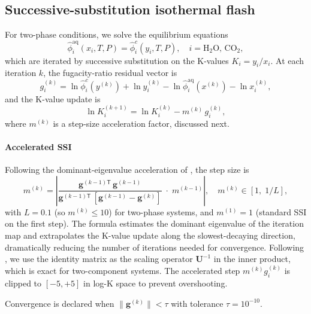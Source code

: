\documentclass[preprint,12pt,authoryear]{elsarticle}
\begin{document}
\subsection{Successive-substitution isothermal flash}
\label{sec:ssi}

For two-phase conditions, we solve the equilibrium equations
\begin{equation}
  \hat{\phi}_i^{\text{aq}}(x_i, T, P) = \hat{\phi}_i^c(y_i, T, P), \quad i = \text{H}_2\text{O},\, \text{CO}_2,
  \label{eq:iso_eq}
\end{equation}
which are iterated by successive substitution on the K-values $K_i = y_i / x_i$.  At each iteration $k$, the fugacity-ratio residual vector is
\begin{equation}
  g_i^{(k)} = \ln\hat{\phi}_i^c(y^{(k)}) + \ln y_i^{(k)}
             - \ln\hat{\phi}_i^{\text{aq}}(x^{(k)}) - \ln x_i^{(k)},
  \label{eq:lng}
\end{equation}
and the K-value update is
\begin{equation}
  \ln K_i^{(k+1)} = \ln K_i^{(k)} - m^{(k)}\, g_i^{(k)},
  \label{eq:ssi}
\end{equation}
where $m^{(k)}$ is a step-size acceleration factor, discussed next.

\paragraph{Accelerated SSI}
Following the dominant-eigenvalue acceleration of \citet{Jex2024}, the step size is
\begin{equation}
  m^{(k)} = \left| \frac{\mathbf{g}^{(k-1)\mathsf{T}}\, \mathbf{g}^{(k-1)}}
                   {\mathbf{g}^{(k-1)\mathsf{T}}\,[\mathbf{g}^{(k-1)} - \mathbf{g}^{(k)}]}
             \;\cdot\; m^{(k-1)} \right|, \quad
  m^{(k)} \in [1,\; 1/L],
  \label{eq:accel_m}
\end{equation}
with $L = 0.1$ (so $m^{(k)} \leq 10$) for two-phase systems, and $m^{(1)} = 1$
(standard SSI on the first step).
The formula estimates the dominant eigenvalue of the iteration map and extrapolates
the K-value update along the slowest-decaying direction, dramatically reducing the
number of iterations needed for convergence.
Following \citet{Jex2024}, we use the identity matrix as the scaling operator
$\mathbf{U}^{-1}$ in the inner product, which is exact for two-component systems.
The accelerated step $m^{(k)} g_i^{(k)}$ is clipped to $[-5, +5]$ in log-K space
to prevent overshooting.

Convergence is declared when $\|\mathbf{g}^{(k)}\| < \tau$ with tolerance $\tau = 10^{-10}$.
\end{document}
